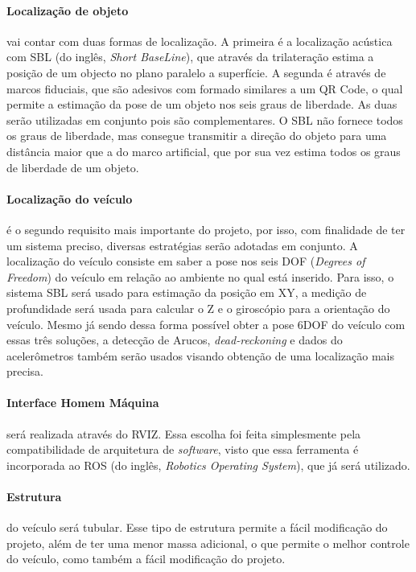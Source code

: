 \paragraph{Localização de objeto} vai contar com duas formas de localização. A primeira é a localização acústica com SBL (do inglês, \textit{Short BaseLine}), que através da trilateração estima a posição de um objecto no plano paralelo a superfície. A segunda é através de marcos fiduciais, que são adesivos com formado similares a um QR Code, o qual permite a estimação da pose de um objeto nos seis graus de liberdade. As duas serão utilizadas em conjunto pois são complementares. O SBL não fornece todos os graus de liberdade, mas consegue transmitir a direção do objeto para uma distância maior que a do marco artificial, que por sua vez estima todos os graus de liberdade de um objeto.

\paragraph{Localização do veículo} é o segundo requisito mais importante do projeto, por isso, com finalidade de ter um sistema preciso, diversas estratégias serão adotadas em conjunto. A localização do veículo consiste em saber a pose nos seis DOF (\textit{Degrees of Freedom}) do veículo em relação ao ambiente no qual está inserido. Para isso, o sistema SBL será usado para estimação da posição em XY, a medição de profundidade será usada para calcular o Z e o giroscópio para a orientação do veículo. Mesmo já sendo dessa forma possível obter a pose 6DOF do veículo com essas três soluções, a detecção de Arucos, \textit{dead-reckoning} e dados do acelerômetros também serão usados visando obtenção de uma localização mais precisa. 

\paragraph{Interface Homem Máquina} será realizada através do RVIZ. Essa escolha foi feita simplesmente pela compatibilidade de arquitetura de \textit{software}, visto que essa ferramenta é incorporada ao ROS (do inglês, \textit{Robotics Operating System}), que já será utilizado.

\paragraph{Estrutura} do veículo será tubular. Esse tipo de estrutura permite a fácil modificação do projeto, além de ter uma menor massa adicional, o que permite o melhor controle do veículo, como também a fácil modificação do projeto.

